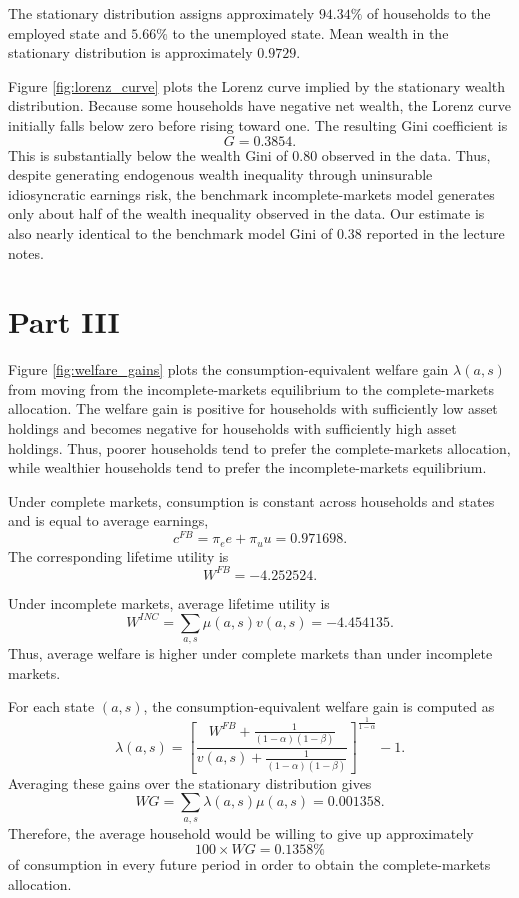 \documentclass{article}
\begin{document}
        The stationary distribution assigns approximately $94.34\%$ of
        households to the employed state and $5.66\%$ to the unemployed state.
        Mean wealth in the stationary distribution is approximately $0.9729$.

        Figure \ref{fig:lorenz_curve} plots the Lorenz curve implied by the
        stationary wealth distribution. Because some households have negative
        net wealth, the Lorenz curve initially falls below zero before rising
        toward one. The resulting Gini coefficient is
        \[
            G = 0.3854.
        \]
        This is substantially below the wealth Gini of $0.80$ observed in the
        data. Thus, despite generating endogenous wealth inequality through
        uninsurable idiosyncratic earnings risk, the benchmark incomplete-markets
        model generates only about half of the wealth inequality observed in the
        data. Our estimate is also nearly identical to the benchmark model Gini
        of $0.38$ reported in the lecture notes.

    \section*{Part III}

    Figure \ref{fig:welfare_gains} plots the consumption-equivalent welfare
    gain $\lambda(a,s)$ from moving from the incomplete-markets equilibrium
    to the complete-markets allocation. The welfare gain is positive for
    households with sufficiently low asset holdings and becomes negative
    for households with sufficiently high asset holdings. Thus, poorer
    households tend to prefer the complete-markets allocation, while
    wealthier households tend to prefer the incomplete-markets equilibrium.

    Under complete markets, consumption is constant across households and
    states and is equal to average earnings,
    \[
        c^{FB}
        =
        \pi_e e + \pi_u u
        =
        0.971698.
    \]
    The corresponding lifetime utility is
    \[
        W^{FB}
        =
        -4.252524.
    \]

    Under incomplete markets, average lifetime utility is
    \[
        W^{INC}
        =
        \sum_{a,s} \mu(a,s)v(a,s)
        =
        -4.454135.
    \]
    Thus, average welfare is higher under complete markets than under
    incomplete markets.

    For each state $(a,s)$, the consumption-equivalent welfare gain is
    computed as
    \[
        \lambda(a,s)
        =
        \left[
            \frac{
                W^{FB}
                +
                \frac{1}{(1-\alpha)(1-\beta)}
            }{
                v(a,s)
                +
                \frac{1}{(1-\alpha)(1-\beta)}
            }
        \right]^{\frac{1}{1-\alpha}}
        -1.
    \]
    Averaging these gains over the stationary distribution gives
    \[
        WG
        =
        \sum_{a,s}
        \lambda(a,s)\mu(a,s)
        =
        0.001358.
    \]
    Therefore, the average household would be willing to give up
    approximately
    \[
        100\times WG
        =
        0.1358\%
    \]
    of consumption in every future period in order to obtain the
    complete-markets allocation.
\end{document}
